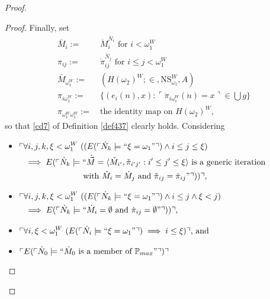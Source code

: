 \documentclass[12pt, twoside]{memoir}
\numberwithin{equation}{section}
\theoremstyle{definition}
\theoremstyle{remark}
\theoremstyle{definition}
\theoremstyle{definition}
\theoremstyle{definition}
\theoremstyle{remark}
\begin{document}
\begin{proof}
\begin{proof}
Finally, set
\begin{align*}
    \bar{M}_i := \ & \dot{M}_i^{\bar{N}_i} \text{ for } i < \omega_1^W \\
    \pi_{ij} := \ & \dot{\pi}_{ij}^{\bar{N}_j} \text{ for } i \leq j < \omega_1^W \\
    \bar{M}_{\omega_1^W} := \ & (H(\omega_2)^W; \in, \mathrm{NS}_{\omega_1}^W, A) \\
    \pi_{i\omega_1^W} := \ & \{(e_i(n), x) : \ulcorner \dot{\pi}_{i\omega_1^W}(\dot{n}) = x \urcorner \in \bigcup g\} \\
    \pi_{\omega_1^W\omega_1^W} := \ & \text{the identity map on } H(\omega_2)^W \text{,}
\end{align*}
so that \ref{cd7} of Definition \ref{def437} clearly holds. Considering 
\begin{itemize}
    \item
    \!
    $\begin{aligned}[t]
        \ulcorner & \forall i, j, k, \xi < \omega_1^W \ ((E(\ulcorner \dot{N}_k \models ``\xi = \omega_1" \urcorner) \wedge i \leq j \leq \xi) \\ 
        & \implies E(\ulcorner \dot{N}_{k} \models ``\dot{\Vec{M}} = \langle \check{M}_{i'}, \check{\pi}_{i'j'} : i' \leq j' \leq \xi \rangle \text{ is a generic iteration} \\
        & \mspace{130mu} \text{with } \check{M}_{i} = \dot{M}_j \text{ and } \check{\pi}_{ij} = \dot{\pi}_{ij}" \urcorner)) \urcorner \text{,}
    \end{aligned}$
    \item
    \!
    $\begin{aligned}[t]
        \ulcorner & \forall i, j, k, \xi < \omega_1^W \ ((E(\ulcorner \dot{N}_k \models ``\xi = \omega_1" \urcorner) \wedge i \leq j \wedge \xi < j) \\ 
        & \implies E(\ulcorner \dot{N}_{k} \models ``\dot{M}_i = \emptyset \text{ and } \dot{\pi}_{ij} = \emptyset" \urcorner)) \urcorner \text{,}
    \end{aligned}$
    \item 
    \!
    $\begin{aligned}[t]
        \ulcorner & \forall i, \xi < \omega_1^W \ (E(\ulcorner \dot{N}_i \models ``\xi = \omega_1" \urcorner) \implies i \leq \xi) \urcorner \text{, and}
    \end{aligned}$
    \item $\ulcorner E(\ulcorner \dot{N}_0 \models ``\dot{M}_0 \text{ is a member of } \mathbb{P}_{max}" \urcorner) \urcorner$

\end{itemize}
\end{proof}
\end{proof}
\end{document}
